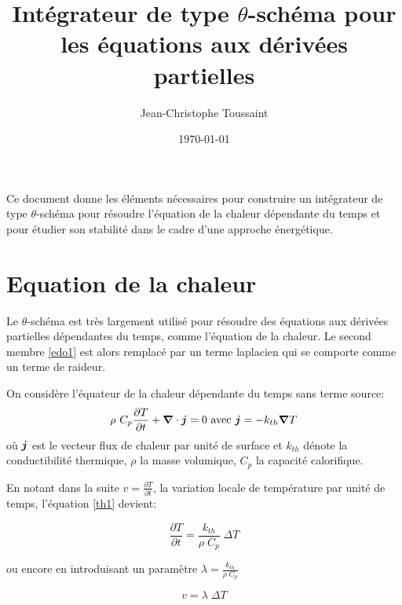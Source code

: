 \documentclass[a4paper, 12pt]{article}
\newcommand{\gv}[1]{\ensuremath{\mbox{\boldmath$ #1 $}}}
\newcommand{\grad}[1]{\gv{\nabla} #1} %
\renewcommand{\div}[1]{\gv{\nabla} \cdot #1} %
\begin{document}


\title{Intégrateur de type $\theta$-schéma pour les équations aux dérivées partielles}

\author{Jean-Christophe Toussaint\\
}
\date{\today}
 

\maketitle

Ce document donne les éléments nécessaires pour construire un intégrateur de type $\theta$-schéma pour résoudre
l'équation de la chaleur dépendante du temps et pour étudier son stabilité dans le cadre d'une approche énergétique.

\section{Equation de la chaleur}

Le  $\theta$-schéma est très largement utilisé pour résoudre  des équations aux dérivées partielles
dépendantes du temps, comme l'équation de la chaleur.
Le second membre \eqref{edo1} est alors remplacé par un terme laplacien
qui se comporte comme un
terme de raideur.

\noindent On considère l'équateur de la chaleur dépendante du temps sans terme source:
\begin{equation}
\rho\ C_p \frac{\partial T}{\partial t}+ \div \gv{j}=0 \ \text{avec} \ \gv{j}=-k_{th} \grad{T}
\label{th1}
\end{equation}
où $\gv{j}$ est le vecteur flux de chaleur par unité de surface et $k_{th} $ dénote la conductibilité thermique, $\rho$ la masse volumique, $C_p$ la capacité calorifique.

En notant dans la suite $v=\frac{\partial T}{\partial t}$, la variation locale de température par unité de temps, l'équation \eqref{th1} devient:

\begin{equation}
\frac{\partial T}{\partial t}  = \frac{k_{th}}{\rho\; C_p } \; \Delta T 
\label{th2orig}
\end{equation}

\noindent ou encore en introduisant un paramètre $\lambda=\frac{k_{th}}{\rho\; C_p } $

\begin{equation}
v  =  \lambda \; \Delta T
\label{th2}
\end{equation}
\end{document}
